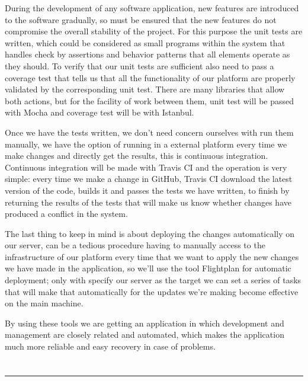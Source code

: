 {\bigskip
During the development of any software application, new features are introduced to the software gradually, so must be ensured
that the new features do not compromise the overall stability of the project. For this purpose the unit tests are written, 
which could be considered as small programs within the system that handles check by assertions and behavior patterns that all
elements operate as they should. To verify that our unit tests are sufficient also need to pass a coverage test that tells us
that all the functionality of our platform are properly validated by the corresponding unit test. There are many libraries that
allow both actions, but for the facility of work between them, unit test will be passed with Mocha and coverage test will be
with Istanbul.

\bigskip
Once we have the tests written, we don't need concern ourselves with run them manually, we have the option of running in a
external platform every time we make changes and directly get the results, this is continuous integration. Continuous
integration will be made with Travis CI and the operation is very simple: every time we make a change in GitHub, Travis CI
download the latest version of the code, builds it and passes the tests we have written, to finish by returning the results
of the tests that will make us know whether changes have produced a conflict in the system. 

\bigskip
The last thing to keep in mind is about deploying the changes automatically on our server, can be a tedious procedure having to
manually access to the infrastructure of our platform every time that we want to apply the new changes we have made in the
application, so we'll use the tool Flightplan for automatic deployment; only with specify our server as the target we can set
a series of tasks that will make that automatically for the updates we're making become effective on the main machine.

\bigskip
By using these tools we are getting an application in which development and management are closely related and automated, which
makes the application much more reliable and easy recovery in case of problems.

\newpage
\thispagestyle{empty}
\chapter*{}

\noindent\rule[-1ex]{\textwidth}{2pt}\\[4.5ex]

}
